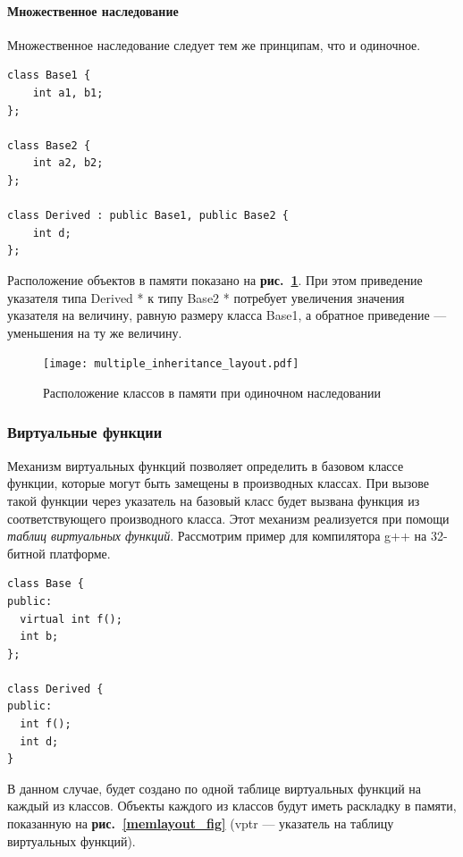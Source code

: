 \documentclass[a4paper,12pt,russian]{article}
\newcommand{\picref}[1]{\textbf{рис.~\ref{#1}}}
\newcommand{\code}[1]{\textsf{#1}}
\begin{document}
\paragraph{Множественное наследование}
Множественное наследование следует тем же принципам, что и одиночное.
\begin{lstlisting}
class Base1 {
    int a1, b1;
};

class Base2 {
    int a2, b2;
};

class Derived : public Base1, public Base2 {
    int d;
};
\end{lstlisting}
Расположение объектов в памяти показано на \picref{multiple_inheritance_layout_fig}.
При этом приведение указателя типа \code{Derived *} к типу \code{Base2 *} потребует увеличения значения указателя на величину, равную размеру класса \code{Base1}, а обратное приведение --- уменьшения на ту же величину.
\begin{figure}
  \center
  \texttt{[image: multiple\_inheritance\_layout.pdf]}
  \hfill
  \caption{Расположение классов в памяти при одиночном наследовании}
  \label{multiple_inheritance_layout_fig}
\end{figure}

\subsubsection{Виртуальные функции}
\label{virtual_call}
Механизм виртуальных функций позволяет определить в базовом классе функции, которые могут быть замещены в производных классах.
При вызове такой функции через указатель на базовый класс будет вызвана функция из соответствующего производного класса.
Этот механизм реализуется при помощи \emph{таблиц виртуальных функций}.
Рассмотрим пример для компилятора g++ на 32-битной платформе.
\begin{lstlisting}
class Base {
public:
  virtual int f();
  int b;
};

class Derived {
public:
  int f();
  int d;
}
\end{lstlisting}
В данном случае, будет создано по одной таблице виртуальных функций на каждый из классов.
Объекты каждого из классов будут иметь раскладку в памяти, показанную на \picref{memlayout_fig} (\code{vptr} --- указатель на таблицу виртуальных функций).
\end{document}
